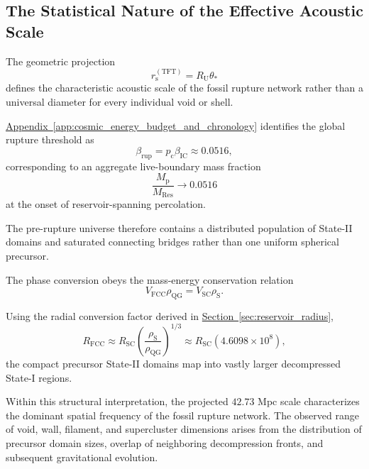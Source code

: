 \subsection{The Statistical Nature of the Effective Acoustic Scale}

The geometric projection
\begin{equation}
    r_{\mathrm s}^{(\mathrm{TFT})}
    =
    R_{\mathrm U}\theta_*
\end{equation}
defines the characteristic acoustic scale of the fossil rupture network rather than a universal diameter for every individual void or shell.

\hyperref[app:cosmic_energy_budget_and_chronology]{Appendix~\ref*{app:cosmic_energy_budget_and_chronology}} identifies the global rupture threshold as
\begin{equation}
    \beta_{\mathrm{rup}}
    =
    p_{\mathrm c}\beta_{\mathrm{IC}}
    \approx
    0.0516,
\end{equation}
corresponding to an aggregate live-boundary mass fraction
\begin{equation}
    \frac{M_{\mathrm p}}
    {M_{\mathrm{Res}}}
    \rightarrow
    0.0516
\end{equation}
at the onset of reservoir-spanning percolation.

The pre-rupture universe therefore contains a distributed population of State-II domains and saturated connecting bridges rather than one uniform spherical precursor.

The phase conversion obeys the mass-energy conservation relation
\begin{equation}
    V_{\mathrm{FCC}}\rho_{\mathrm{QG}}
    =
    V_{\mathrm{SC}}\rho_{\mathrm S}.
\end{equation}

Using the radial conversion factor derived in
\hyperref[sec:reservoir_radius]{Section~\ref*{sec:reservoir_radius}},
\begin{equation}
    R_{\mathrm{FCC}}
    \approx
    R_{\mathrm{SC}}
    \left(
        \frac{\rho_{\mathrm S}}
        {\rho_{\mathrm{QG}}}
    \right)^{1/3}
    \approx
    R_{\mathrm{SC}}
    \left(
        4.6098\times10^8
    \right),
\end{equation}
the compact precursor State-II domains map into vastly larger decompressed State-I regions.

Within this structural interpretation, the projected $42.73$ Mpc scale characterizes the dominant spatial frequency of the fossil rupture network. The observed range of void, wall, filament, and supercluster dimensions arises from the distribution of precursor domain sizes, overlap of neighboring decompression fronts, and subsequent gravitational evolution.


